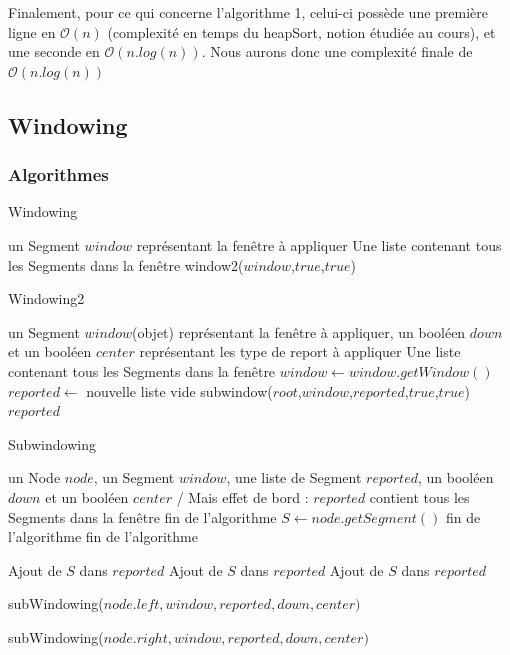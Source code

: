 \documentclass[10pt,a4paper]{article}
\begin{document}
Finalement, pour ce qui concerne l'algorithme 1, celui-ci possède une première ligne en $\mathcal{O}(n)$ (complexité en temps du heapSort, notion étudiée au cours), et une seconde en $\mathcal{O}(n.log(n))$. Nous aurons donc une complexité finale de $\mathcal{O}(n.log(n))$

\subsection{Windowing}


\subsubsection{Algorithmes}

\begin{algorithm}
\caption{Windowing}
\begin{algorithmic}[1]
\REQUIRE un Segment $window$ représentant la fenêtre à appliquer
\ENSURE Une liste contenant tous les Segments dans la fenêtre
\RETURN window2($window$,$true$,$true$)
\end{algorithmic}
\end{algorithm}

\begin{algorithm}
\caption{Windowing2}
\begin{algorithmic}[1]
\REQUIRE un Segment $window$(objet) représentant la fenêtre à appliquer, un booléen $down$ et un booléen $center$ représentant les type de report à appliquer
\ENSURE Une liste contenant tous les Segments dans la fenêtre
\STATE $window \leftarrow window.getWindow()$
\STATE $reported \leftarrow$ nouvelle liste vide
\STATE subwindow($root$,$window$,$reported$,$true$,$true$)
\RETURN $reported$
\end{algorithmic}
\end{algorithm}

\newpage

\begin{algorithm}
\caption{Subwindowing}
\begin{algorithmic}[1]
\REQUIRE un Node $node$, un Segment $window$, une liste de Segment $reported$, un booléen $down$ et un booléen $center$
\ENSURE / Mais effet de bord : $reported$ contient tous les Segments dans la fenêtre
\STATE fin de l'algorithme
\ENDIF
\STATE $S \leftarrow node.getSegment()$
\STATE fin de l'algorithme
\ENDIF
{}
\STATE fin de l'algorithme
\ENDIF


\STATE Ajout de $S$ dans $reported$  
\ENDIF
{}
\STATE Ajout de $S$ dans $reported$  
\ENDIF
{}
\STATE Ajout de $S$ dans $reported$  
\ENDIF

\STATE subWindowing($node.left,window,reported,down,center)$  
\ENDIF

\STATE subWindowing($node.right,window,reported,down,center)$  
\ENDIF

\end{algorithmic}
\end{algorithm}
\end{document}
